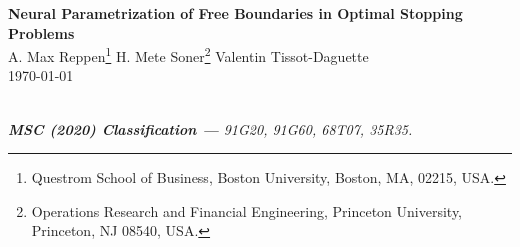\thispagestyle{firststyle}
\begin{center}
    \LARGE %
    \textbf{Neural Parametrization of Free Boundaries in Optimal Stopping Problems}%
    \\%
    \vspace{0.5cm}
    \normalsize  A. Max Reppen\footnote[1]{Questrom School of Business, Boston University, Boston, MA, 02215, USA. } %
    \quad H. Mete Soner\footnote[2]{Operations Research and Financial Engineering, Princeton University, Princeton, NJ 08540, USA.} %
    \quad  Valentin Tissot-Daguette\footnotemark[2]\\%
\vspace{.2cm}
\today
\end{center}

\vspace{-2mm}
\begin{abstract}

\end{abstract}

\\

\textit{\textbf{MSC (2020) Classification —} 
\textnormal{91G20, %
91G60, %
68T07, %
35R35. %
}
}  

\renewcommand{\thefootnote}{\arabic{footnote}}